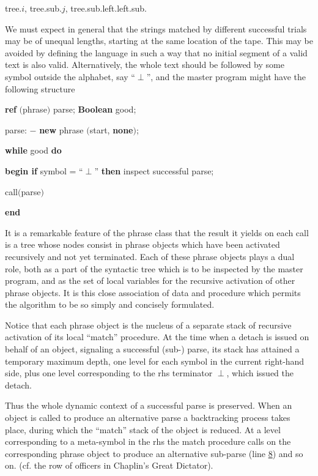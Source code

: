 \quad tree.$i$, tree.sub.$j$, tree.sub.left.left.sub.

We must expect in general that the strings matched by different successful trials may be of unequal lengths, starting at the same location of the tape. This may be avoided by defining the language in such a way that no initial segment of a valid text is also valid. Alternatively, the whole text should be followed by some symbol outside the alphabet, say ``$\perp$'', and the master program might have the following structure

\quad \textbf{ref} $($phrase$)$ parse; \textbf{Boolean} good;

\quad parse: $-$ \textbf{new} phrase $($start, \textbf{none}$)$;

\quad \textbf{while} good \textbf{do}

\quad \textbf{begin if} symbol = ``$\perp$'' \textbf{then} inspect successful parse;

\quad \quad call$($parse$)$

\quad \textbf{end}

It is a remarkable feature of the phrase class that the result it yields on each call is a tree whose nodes consist in phrase objects which have been activated recursively and not yet terminated. Each of these phrase objects plays a dual role, both as a part of the syntactic tree which is to be inspected by the master program, and as the set of local variables for the recursive activation of other phrase objects. It is this close association of data and procedure which permits the algorithm to be so simply and concisely formulated.

Notice that each phrase object is the nucleus of a separate stack of recursive activation of its local ``match'' procedure. At the time when a detach is issued on behalf of an object, signaling a successful (sub-) parse, its stack has attained a temporary maximum depth, one level for each symbol in the current right-hand side, plus one level corresponding to the rhs terminator $\perp$, which issued the detach.

Thus the whole dynamic context of a successful parse is preserved. When an object is called to produce an alternative parse a backtracking process takes place, during which the ``match'' stack of the object is reduced. At a level corresponding to a meta-symbol in the rhs the match procedure calls on the corresponding phrase object to produce an alternative sub-parse (line \hyperref[en:comment-label-8]{8}) and so on. (cf. the row of officers in Chaplin's Great Dictator).

